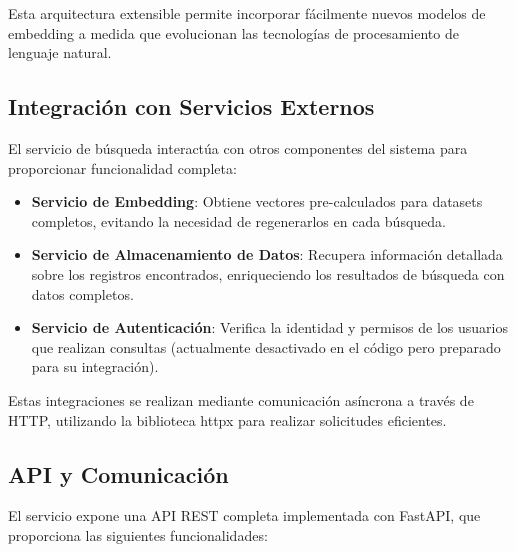 \documentclass[12pt,a4paper]{article}
\begin{document}
Esta arquitectura extensible permite incorporar fácilmente nuevos modelos de embedding a medida que evolucionan las tecnologías de procesamiento de lenguaje natural.

\subsection{Integración con Servicios Externos}
\label{subsec:ss-integracion}

El servicio de búsqueda interactúa con otros componentes del sistema para proporcionar funcionalidad completa:

\begin{itemize}
    \item \textbf{Servicio de Embedding}: Obtiene vectores pre-calculados para datasets completos, evitando la necesidad de regenerarlos en cada búsqueda.
    
    \item \textbf{Servicio de Almacenamiento de Datos}: Recupera información detallada sobre los registros encontrados, enriqueciendo los resultados de búsqueda con datos completos.
    
    \item \textbf{Servicio de Autenticación}: Verifica la identidad y permisos de los usuarios que realizan consultas (actualmente desactivado en el código pero preparado para su integración).
\end{itemize}

Estas integraciones se realizan mediante comunicación asíncrona a través de HTTP, utilizando la biblioteca httpx para realizar solicitudes eficientes.

\subsection{API y Comunicación}
\label{subsec:ss-api}

El servicio expone una API REST completa implementada con FastAPI, que proporciona las siguientes funcionalidades:
\end{document}
